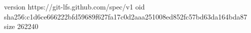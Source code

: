 version https://git-lfs.github.com/spec/v1
oid sha256:c1d6ce666222bfd59689f627fa17c0d2aaa251008ed852fc57bd63da164bda87
size 262240
